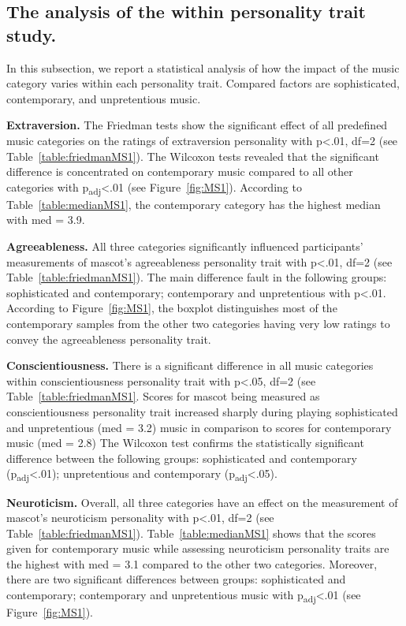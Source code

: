 \subsection{The analysis of the within personality trait study.}
\label{subsec:MSstudy1}
In this subsection, we report a statistical analysis of how the impact of the music category varies within each
personality trait.
Compared factors are sophisticated, contemporary, and unpretentious music.

\par\textbf{Extraversion.}
The Friedman tests show the significant effect of all predefined music categories on the
ratings of extraversion personality with p<.01, df=2 (see Table~\ref{table:friedmanMS1}).
The Wilcoxon tests revealed that the significant difference is concentrated on contemporary music
compared to all other categories with p\textsubscript{adj}<.01 (see Figure~\ref{fig:MS1}).
According to Table~\ref{table:medianMS1}, the contemporary category has the highest median with med = 3.9.

\par\textbf{Agreeableness.}
All three categories significantly influenced participants' measurements of mascot's
agreeableness personality trait with p<.01, df=2 (see Table~\ref{table:friedmanMS1}).
The main difference fault in the following groups: sophisticated and contemporary;
contemporary and unpretentious with p<.01.
According to Figure~\ref{fig:MS1}, the boxplot distinguishes most of the contemporary samples from
the other two categories having very low ratings to convey the agreeableness personality trait.

\par\textbf{Conscientiousness.}
There is a significant difference in all music categories within conscientiousness
personality trait with p<.05, df=2 (see Table~\ref{table:friedmanMS1}.
Scores for mascot being measured as conscientiousness personality trait increased sharply during playing
sophisticated and unpretentious (med = 3.2) music in comparison to scores for contemporary music (med = 2.8)
The Wilcoxon test confirms the statistically significant difference between the following groups:
sophisticated and contemporary (p\textsubscript{adj}<.01); unpretentious and contemporary (p\textsubscript{adj}<.05).

\par\textbf{Neuroticism.}
Overall, all three categories have an effect on the measurement of mascot's neuroticism
personality with p<.01, df=2 (see Table~\ref{table:friedmanMS1}).
Table~\ref{table:medianMS1} shows that the scores given for contemporary music while assessing
neuroticism personality traits are the highest with med = 3.1 compared to the other two categories.
Moreover, there are two significant differences between groups: sophisticated and contemporary;
contemporary and unpretentious music with p\textsubscript{adj}<.01 (see Figure~\ref{fig:MS1}).

